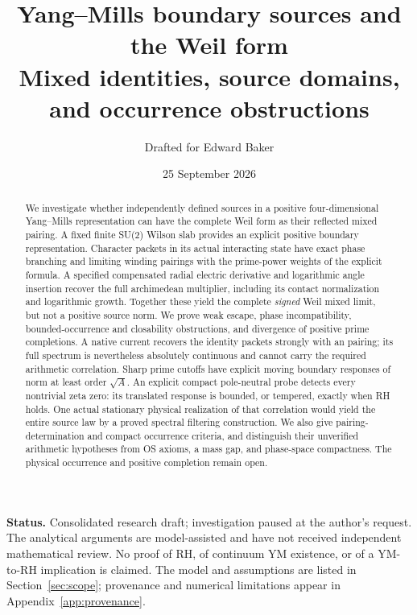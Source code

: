 \documentclass[11pt]{article}
\title{Yang--Mills boundary sources and the Weil form\\[5pt]
\large Mixed identities, source domains, and occurrence obstructions}
\author{Drafted for Edward Baker}
\date{25 September 2026}
\begin{document}
\maketitle
\begin{abstract}
We investigate whether independently defined sources in a positive
four-dimensional Yang--Mills representation can have the complete Weil
form as their reflected mixed pairing. A fixed finite SU(2) Wilson slab
provides an explicit positive boundary representation. Character packets
in its actual interacting state have exact phase branching and limiting
winding pairings with the prime-power weights of the explicit formula.
A specified compensated radial electric derivative and logarithmic
angle insertion recover the full archimedean multiplier, including its
contact normalization and logarithmic growth. Together these yield the
complete \emph{signed} Weil mixed limit, but not a positive source norm.
We prove weak escape, phase incompatibility, bounded-occurrence and
closability obstructions, and divergence of positive prime completions.
A native current recovers the identity packets strongly with an \Ltwo{}
pairing; its full spectrum is nevertheless absolutely continuous and
cannot carry the required arithmetic correlation. Sharp prime cutoffs
have explicit moving boundary responses of norm at least order
$\sqrt A$. An explicit compact pole-neutral probe detects every
nontrivial zeta zero: its translated response is bounded, or tempered,
exactly when RH holds. One actual stationary physical realization of
that correlation would yield the entire source law by a proved spectral
filtering construction. We also give pairing-determination and compact
occurrence criteria, and distinguish their unverified arithmetic
hypotheses from OS axioms, a mass gap, and phase-space compactness.
The physical occurrence and positive completion remain open.
\end{abstract}
\noindent\textbf{Status.} Consolidated research draft; investigation paused
at the author's request. The analytical arguments are model-assisted
and have not received independent mathematical review. No proof of RH,
of continuum YM existence, or of a YM-to-RH implication is claimed.
The model and assumptions are listed in Section~\ref{sec:scope};
provenance and numerical limitations appear in Appendix~\ref{app:provenance}.
\clearpage
{\small\tableofcontents}
\clearpage











\appendix



\clearpage
\end{document}
